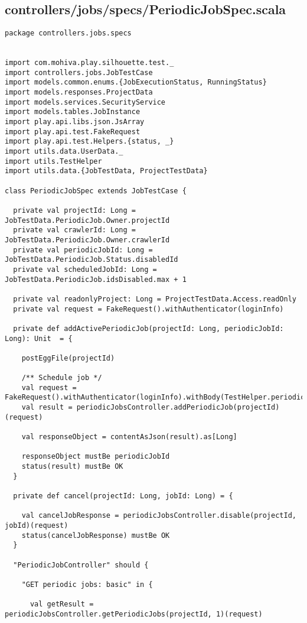 \subsection{controllers/jobs/specs/PeriodicJobSpec.scala}
\begin{lstlisting}
package controllers.jobs.specs


import com.mohiva.play.silhouette.test._
import controllers.jobs.JobTestCase
import models.common.enums.{JobExecutionStatus, RunningStatus}
import models.responses.ProjectData
import models.services.SecurityService
import models.tables.JobInstance
import play.api.libs.json.JsArray
import play.api.test.FakeRequest
import play.api.test.Helpers.{status, _}
import utils.data.UserData._
import utils.TestHelper
import utils.data.{JobTestData, ProjectTestData}

class PeriodicJobSpec extends JobTestCase {

  private val projectId: Long = JobTestData.PeriodicJob.Owner.projectId
  private val crawlerId: Long = JobTestData.PeriodicJob.Owner.crawlerId
  private val periodicJobId: Long = JobTestData.PeriodicJob.Status.disabledId
  private val scheduledJobId: Long = JobTestData.PeriodicJob.idsDisabled.max + 1

  private val readonlyProject: Long = ProjectTestData.Access.readOnly
  private val request = FakeRequest().withAuthenticator(loginInfo)

  private def addActivePeriodicJob(projectId: Long, periodicJobId: Long): Unit  = {

    postEggFile(projectId)

    /** Schedule job */
    val request = FakeRequest().withAuthenticator(loginInfo).withBody(TestHelper.periodicJobForm)
    val result = periodicJobsController.addPeriodicJob(projectId)(request)

    val responseObject = contentAsJson(result).as[Long]

    responseObject mustBe periodicJobId
    status(result) mustBe OK
  }

  private def cancel(projectId: Long, jobId: Long) = {

    val cancelJobResponse = periodicJobsController.disable(projectId, jobId)(request)
    status(cancelJobResponse) mustBe OK
  }

  "PeriodicJobController" should {

    "GET periodic jobs: basic" in {

      val getResult = periodicJobsController.getPeriodicJobs(projectId, 1)(request)


\end{lstlisting}
